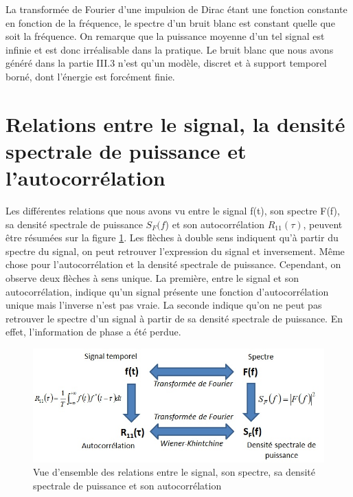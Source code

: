 	La transformée de Fourier d'une impulsion de Dirac étant une fonction constante en fonction de la fréquence, le spectre d'un bruit blanc est constant quelle que soit la fréquence. On remarque que la puissance moyenne d'un tel signal est infinie et est donc irréalisable dans la pratique. Le bruit blanc que nous avons généré dans la partie III.3 n'est qu'un modèle, discret et à support temporel borné, dont l'énergie est forcément finie.
	
	
	\vspace{1\baselineskip}
	
	
	\section{Relations entre le signal, la densité spectrale de puissance et l'autocorrélation}
	
	Les différentes relations que nous avons vu entre le signal f(t), son spectre F(f), sa densité spectrale de puissance $S_{F}(f$) et son autocorrélation $R_{11}(\tau)$, peuvent être résumées sur la figure \ref{Fig:Relations_f_F_R_S.jpg}. Les flèches à double sens indiquent qu'à partir du spectre du signal, on peut retrouver l'expression du signal et inversement. Même chose pour l'autocorrélation et la densité spectrale de puissance. Cependant, on observe deux flèches à sens unique. La première, entre le signal et son autocorrélation, indique qu'un signal présente une fonction d'autocorrélation unique mais l'inverse n'est pas vraie. La seconde indique qu'on ne peut pas retrouver le spectre d'un signal à partir de sa densité spectrale de puissance. En effet, l'information de phase a été perdue.
	
	\begin{figure}[h!]
		\centering
		\includegraphics[scale=0.7]{images/Relations_f_F_R_S.jpg}
		\caption{Vue d'ensemble des relations entre le signal, son spectre, sa densité spectrale de puissance et son autocorrélation}	
		\label{Fig:Relations_f_F_R_S.jpg} 
	\end{figure}
	
